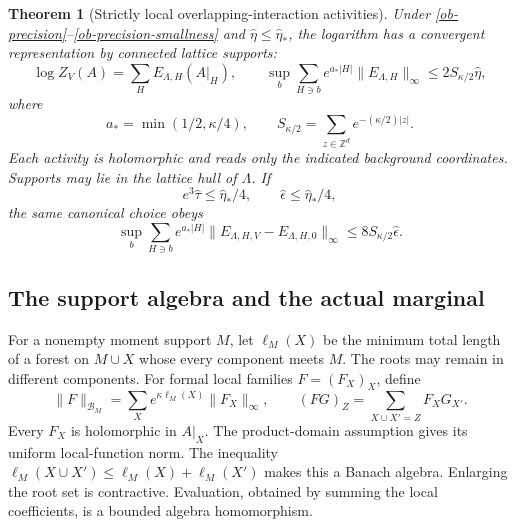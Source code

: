 \documentclass[11pt]{article}
\newtheorem{theorem}{Theorem}[section]
\begin{document}
\begin{theorem}[Strictly local overlapping-interaction activities]
\label{ob-theorem}
Under \eqref{ob-precision}--\eqref{ob-precision-smallness} and
$\widehat\eta\le\widehat\eta_*$, the logarithm has a convergent
representation by connected lattice supports:
\begin{equation}\label{ob-local-log}
 \log Z_V(A)=\sum_H E_{\Lambda,H}(A|_H),\qquad
 \sup_b\sum_{H\ni b}e^{a_*|H|}
        \|E_{\Lambda,H}\|_\infty
 \le2S_{\kappa/2}\widehat\eta,
\end{equation}
where
\[
 a_*=\min(1/2,\kappa/4),\qquad
 S_{\kappa/2}=\sum_{z\in\mathbb Z^d}e^{-(\kappa/2)|z|}.
\]
Each activity is holomorphic and reads only the indicated
background coordinates. Supports may lie in the lattice hull of
$\Lambda$. If
\begin{equation}\label{ob-quarter}
 e^3\widehat\tau\le\widehat\eta_*/4,\qquad
 \widehat\epsilon\le\widehat\eta_*/4,
\end{equation}
the same canonical choice obeys
\begin{equation}\label{ob-difference}
 \sup_b\sum_{H\ni b}e^{a_*|H|}
  \|E_{\Lambda,H,V}-E_{\Lambda,H,0}\|_\infty
 \le8S_{\kappa/2}\widehat\epsilon.
\end{equation}
\end{theorem}

\subsection{The support algebra and the actual marginal}

For a nonempty moment support $M$, let $\ell_M(X)$ be the
minimum total length of a forest on $M\cup X$ whose every
component meets $M$. The roots may remain in different components.
For formal local families $F=(F_X)_X$, define
\begin{equation}\label{ob-algebra}
 \|F\|_{\mathcal B_M}
   =\sum_Xe^{\kappa\ell_M(X)}\|F_X\|_\infty,\qquad
 (FG)_Z=\sum_{X\cup X'=Z}F_XG_{X'}.
\end{equation}
Every $F_X$ is holomorphic in $A|_X$. The product-domain
assumption gives its uniform local-function norm.
The inequality
$\ell_M(X\cup X')\le\ell_M(X)+\ell_M(X')$
makes this a Banach algebra. Enlarging the root set is
contractive. Evaluation, obtained by summing the local
coefficients, is a bounded algebra homomorphism.
\end{document}
